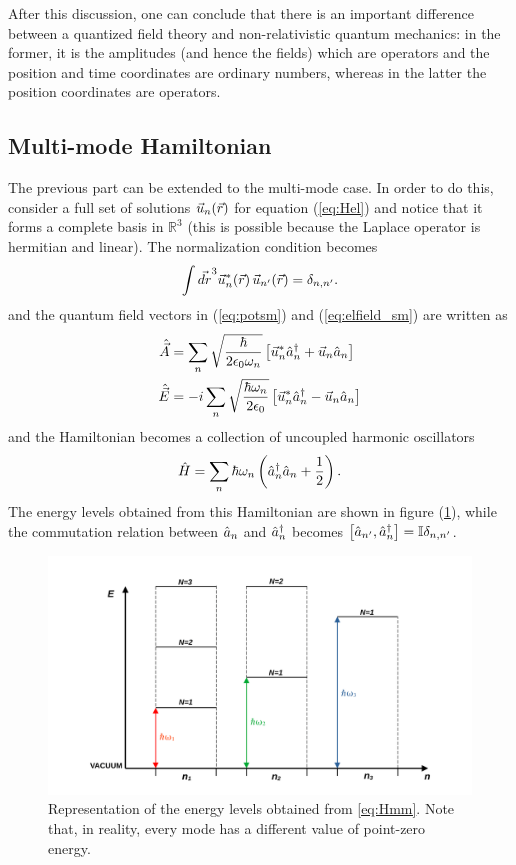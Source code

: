After this discussion, one can conclude that there is an important difference between a quantized field theory and non-relativistic quantum mechanics: in the former, it is the amplitudes (and hence the fields) which are operators and the position and time coordinates are ordinary numbers, whereas in the latter the position coordinates are operators. 

\subsection{Multi-mode Hamiltonian}
The previous part can be extended to the multi-mode case. In order to do this, consider a full set of solutions $\vec{u}_{n}(\vec{r})$ for equation (\ref{eq:Hel}) and notice that it forms a complete basis in $\mathbb{R}^3$ (this is possible because the Laplace operator is hermitian and linear). The normalization condition becomes
\begin{equation}
    \int \vec{dr}^{3} \vec{u}_{n}^{\ast}(\vec{r}) \, \vec{u}_{n'}(\vec{r}) = \delta_{n, n'}. 
    \label{eq:norm_cond}
\end{equation}
and the quantum field vectors in (\ref{eq:potsm}) and (\ref{eq:elfield_sm}) are written as 
\begin{align}
    \hat{\vec{A}} &= \sum\limits_{n} \sqrt{\frac{\hbar}{2 \epsilon_{0} \omega_{n}}}\left[ \vec{u}_{n}^{\ast} \hat{a}^{\dagger}_{n} + \vec{u}_{n} \hat{a}_{n} \right] \\
    \hat{\vec{E}} &= - i \sum\limits_{n} \sqrt{\frac{\hbar \omega_n}{2 \epsilon_0}} \left[ \vec{u}_{n}^{\ast} \hat{a}^{\dagger}_{n} - \vec{u}_{n} \hat{a}_{n} \right]
\end{align}
and the Hamiltonian becomes a collection of uncoupled harmonic oscillators
\begin{equation}
    \hat{H} = \sum\limits_{n} \hbar \omega_n \left( \hat{a}^{\dagger}_{n} \hat{a}_{n} + \frac{1}{2} \right). 
    \label{eq:Hmm}
\end{equation}
The energy levels obtained from this Hamiltonian are shown in figure (\ref{fig:HspaceQF}), while the commutation relation between $\hat{a}_{n}$ and $\hat{a}^{\dagger}_{n}$ becomes $\left[\hat{a}_{n'},\hat{a}^{\dagger}_{n}\right] = \mathbb{I} \delta_{n,n'} $. 

\begin{figure}[h!]
\centering
\includegraphics[width=0.8\linewidth]{images/Hilbert_space_QF.png}
\caption{Representation of the energy levels obtained from \ref{eq:Hmm}. Note that, in reality, every mode has a different value of point-zero energy.}
\label{fig:HspaceQF}
\end{figure}

